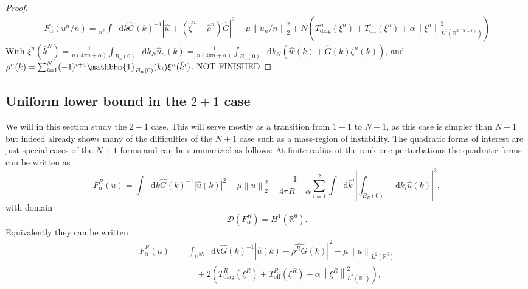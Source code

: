\documentclass[a4paper,11pt]{article}
\newcommand{\norm}[1]{\left\lVert #1 \right\rVert}
\newcommand{\abs}[1]{\left\lvert #1 \right\rvert}
\newcommand{\dom}[1]{\mathscr D\left(#1\right)}
\newcommand*\diff{\mathop{}\!\mathrm{d}}
\newcommand{\R}{\mathbb{R}}
\numberwithin{equation}{section}
\begin{document}
\begin{proof}
\begin{equation}
	\begin{aligned}
	F_\alpha^n(u^n/n)
	=\frac{1}{n^2}\int\diff k \hat{G}(k)^{-1}\abs{\hat{w}+(\hat{\zeta}^n-\hat{\rho}^n)\hat{G}}^2-\mu\norm{u_n/n}^2_2+N\left(T^n_{\text{diag}}(\xi^n)+T^n_{\text{off}}(\xi^n)+\alpha\norm{\xi^n}^2_{L^2(\R^{3(N-1)})}\right)
	\end{aligned}
	\end{equation}
	With $ \xi^n(\bar{k}^N)=\frac{1}{n(4\pi n+\alpha)}\int_{B_n(0)}\diff k_N\hat{u}_n(k)=\frac{1}{n(4\pi n+\alpha)}\int_{B_n(0)}\diff k_N \left(\hat{w}(k)+\hat{G}(k)\zeta^n(k)\right) $, and\\ $ \rho^n(k)=\sum_{i=1}^{N}(-1)^{i+1}\mathbbm{1}_{B_n(0)}(k_i)\xi^n(\bar{k}^i) $. NOT FINISHED
\end{proof}\subsection{Uniform lower bound in the $ 2+1 $ case}
We will in this section study the $ 2+1 $ case. This will serve mostly as a transition from $ 1+1 $ to $ N+1 $, as this case is simpler than $ N+1 $ but indeed already shows many of the difficulties of the $ N+1 $ case such as a mass-region of instability. The quadratic forms of interest are just special cases of the $ N+1 $ forms and can be summarized as follows: At finite radius of the rank-one perturbations the quadratic forms can be written as\begin{equation}
F_\alpha^R(u)=\int\diff k \hat{G}(k)^{-1}\abs{\hat{u}(k)}^2-\mu\norm{u}_2^2-\frac{1}{4\pi R+\alpha}\sum_{i=1}^{2}\int\diff\bar{k}^i\left\lvert\int_{B_R(0)}\diff k_i\hat{u}(k)\right\rvert^2,
\end{equation}
with domain \begin{equation}
\dom{F_\alpha^R}=H^1(\R^6).
\end{equation}
Equivalently they can be written
\begin{equation}
\begin{aligned}
F_\alpha^R(u)=&\int_{\R^{3N}}\diff k \hat{G}(k)^{-1}|\hat{u}(k)-\widehat{\rho^R G}(k)|^2-\mu\norm{u}_{L^2(\R^{6})}\\&\quad+2\left(T^R_{\text{diag}}(\xi^R)+T^R_{\text{off}}(\xi^R)+\alpha\norm{\xi^R}_{L^2(\R^{3})}^2\right),
\end{aligned}
\end{equation}
\end{document}
